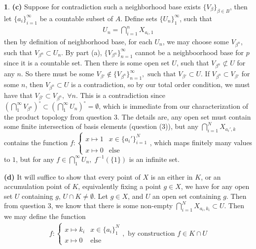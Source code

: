 \documentclass[10.5pt]{article}
\theoremstyle{definition}
\newtheorem{pb}{}
\newcommand{\set}[1]{\{#1\}}
\begin{document}
\begin{pb}
        \textbf{(c)} Suppose for contradiction such a neighborhood base exists \(\set{V_\beta}_{\beta \in B}\), then let \(\set{a_i}_{i=1}^\infty\) be a countable subset of \(A\). Define sets \(\set{U_n}_1^\infty\), such that
        \begin{align*}
            U_n = \bigcap_{i=1}^n X_{a_i,1}
        \end{align*}
        then by definition of neighborhood base, for each \(U_n\), we may choose some \(V_{\beta^n}\), such that \(V_{\beta^n} \subset U_n\). By part (a),
        \(\set{V_{\beta^n}}_{n=1}^\infty\) cannot be a neighboorhood base for \(p\) since it is a countable set. Then there is some open set \(U\), such that
        \(V_{\beta^n} \not \subset U\) for any \(n\). So there must be some \(V_{\beta'} \not \in \set{V_{\beta^n}}_{n=1}^\infty, \text{ such that } V_{\beta'} \subset U\). If \(V_{\beta^n} \subset V_{\beta'}\) for some \(n\), then \(V_{\beta^n} \subset U\) is a contradiction, so by our total order condition, we must have that \(V_{\beta'} \subset V_{\beta^n}, \; \forall n\). This is a contradiction since \(\left(\bigcap_1^\infty V_{\beta^n}\right)^\circ \subset \left(\bigcap_1^\infty U_n\right)^\circ = \emptyset\), which is immediate from our characterization of the product topology from question 3. The details are, any open set must contain some finite intersection of basis elements (question (3)), but any \(\bigcap_{i=1}^N X_{a_i',k}\) contains the function \(f: \begin{cases}
            x \mapsto 1 & x \in \set{a_i'}_{i=1}^N \\
            x \mapsto 0 & \text{else}
        \end{cases}\), which maps finitely many values to \(1\), but for any \(f \in \bigcap_1^\infty U_n, \; f^{-1}(\set{1})\) is an infinite set.

        \textbf{(d)} It will suffice to show that every point of \(X\) is an either in \(K\), or an accumulation point of \(K\), equivalently fixing a point \(g \in X\), we have for any open set \(U\) containing \(g\), \(U \cap K \neq \emptyset\). Let \(g \in X\), and \(U\) an open set containing \(g\). Then from question 3, we know that there is some non-empty \(\bigcap_{i=1}^N X_{a_i,k_i} \subset U\). Then we may define the function
        \begin{align*}
            f: \begin{cases}
                x \mapsto k_i & x \in \set{a_i}_1^N \\
                x \mapsto 0 & \text{else}
            \end{cases}, \text{ by construction } f \in K\cap U
        \end{align*}


\end{pb}
\end{document}
